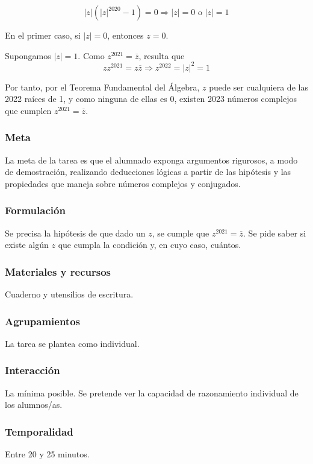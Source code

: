 \documentclass[../main.tex]{memoir}
\begin{document}
$$|z|(|z|^{2020}-1) = 0 \Rightarrow |z| = 0 \text{ o } |z| = 1$$

En el primer caso, si $|z| = 0$, entonces $z=0$.

Supongamos $|z| = 1$. Como  $z^{2021}= \overline{z}$, resulta que 
$$z z^{2021}= z \overline{z} \Rightarrow z^{2022} = |z|^2 = 1$$

Por tanto, por el Teorema Fundamental del Álgebra, $z$ puede ser cualquiera de las 2022 raíces de 1, y como ninguna de ellas es 0, existen 2023 números complejos que cumplen $z^{2021}= \overline{z}$.


\subsubsection{Meta}
La meta de la tarea es que el alumnado exponga argumentos rigurosos, a modo de demostración, realizando deducciones lógicas a partir de las hipótesis y las propiedades que maneja sobre números complejos y conjugados.

\subsubsection{Formulación}
Se precisa la hipótesis de que dado un $z$, se cumple que $z^{2021} = \overline{z}$. Se pide saber si existe algún $z$ que cumpla la condición y, en cuyo caso, cuántos.

\subsubsection{Materiales y recursos}
Cuaderno y utensilios de escritura.


\subsubsection{Agrupamientos}
La tarea se plantea como individual.



\subsubsection{Interacción}
La mínima posible. Se pretende ver la capacidad de razonamiento individual de los alumnos/as.


\subsubsection{Temporalidad}
Entre 20 y 25 minutos.
\end{document}

